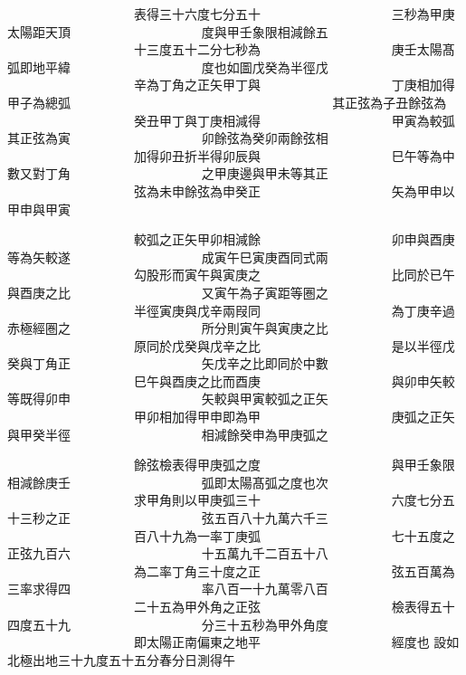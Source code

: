 \begin{正文}
　　　　　　　　　　表得三十六度七分五十
　　　　　　　　　　三秒為甲庚太陽距天頂
　　　　　　　　　　度與甲壬象限相減餘五
　　　　　　　　　　十三度五十二分七秒為
　　　　　　　　　　庚壬太陽髙弧即地平緯
　　　　　　　　　　度也如圖戊癸為半徑戊
　　　　　　　　　　辛為丁角之正矢甲丁與
　　　　　　　　　　丁庚相加得甲子為總弧
　　　　　　　　　　其正弦為子丑餘弦為
　　　　　　　　　　癸丑甲丁與丁庚相減得
　　　　　　　　　　甲寅為較弧其正弦為寅
　　　　　　　　　　卯餘弦為癸卯兩餘弦相
　　　　　　　　　　加得卯丑折半得卯辰與
　　　　　　　　　　巳午等為中數又對丁角
　　　　　　　　　　之甲庚邊與甲未等其正
　　　　　　　　　　弦為未申餘弦為申癸正
　　　　　　　　　　矢為甲申以甲申與甲寅
\par
\end{正文}\clearpage
{}
\begin{正文}
　　　　　　　　　　較弧之正矢甲卯相減餘
　　　　　　　　　　卯申與酉庚等為矢較遂
　　　　　　　　　　成寅午巳寅庚酉同式兩
　　　　　　　　　　勾股形而寅午與寅庚之
　　　　　　　　　　比同於已午與酉庚之比
　　　　　　　　　　又寅午為子寅距等圏之
　　　　　　　　　　半徑寅庚與戊辛兩叚同
　　　　　　　　　　為丁庚辛過赤極經圏之
　　　　　　　　　　所分則寅午與寅庚之比
　　　　　　　　　　原同於戊癸與戊辛之比
　　　　　　　　　　是以半徑戊癸與丁角正
　　　　　　　　　　矢戊辛之比即同於中數
　　　　　　　　　　巳午與酉庚之比而酉庚
　　　　　　　　　　與卯申矢較等既得卯申
　　　　　　　　　　矢較與甲寅較弧之正矢
　　　　　　　　　　甲卯相加得甲申即為甲
　　　　　　　　　　庚弧之正矢與甲癸半徑
　　　　　　　　　　相減餘癸申為甲庚弧之
\par
\end{正文}\clearpage
{}
\begin{正文}
　　　　　　　　　　餘弦檢表得甲庚弧之度
　　　　　　　　　　與甲壬象限相減餘庚壬
　　　　　　　　　　弧即太陽髙弧之度也次
　　　　　　　　　　求甲角則以甲庚弧三十
　　　　　　　　　　六度七分五十三秒之正
　　　　　　　　　　弦五百八十九萬六千三
　　　　　　　　　　百八十九為一率丁庚弧
　　　　　　　　　　七十五度之正弦九百六
　　　　　　　　　　十五萬九千二百五十八
　　　　　　　　　　為二率丁角三十度之正
　　　　　　　　　　弦五百萬為三率求得四
　　　　　　　　　　率八百一十九萬零八百
　　　　　　　　　　二十五為甲外角之正弦
　　　　　　　　　　檢表得五十四度五十九
　　　　　　　　　　分三十五秒為甲外角度
　　　　　　　　　　即太陽正南偏東之地平
　　　　　　　　　　經度也
設如北極出地三十九度五十五分春分日測得午
\par
\end{正文}\clearpage
